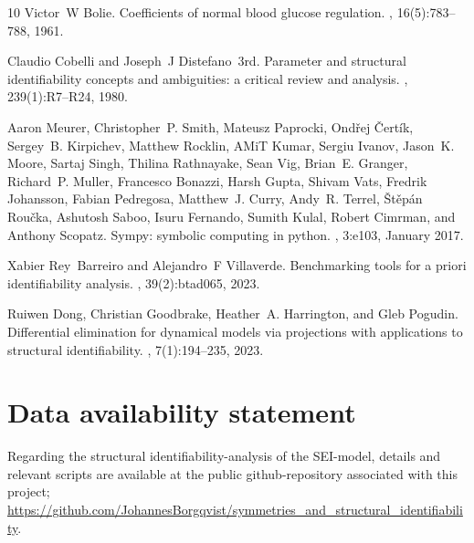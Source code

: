 \documentclass[12pt]{article}
\begin{document}
\begin{thebibliography}{10}
Victor~W Bolie.
\newblock Coefficients of normal blood glucose regulation.
, 16(5):783--788, 1961.

Claudio Cobelli and Joseph~J Distefano~3rd.
\newblock Parameter and structural identifiability concepts and ambiguities: a
  critical review and analysis.
, 239(1):R7--R24, 1980.

Aaron Meurer, Christopher~P. Smith, Mateusz Paprocki, Ond\v{r}ej
  \v{C}ert\'{i}k, Sergey~B. Kirpichev, Matthew Rocklin, AMiT Kumar, Sergiu
  Ivanov, Jason~K. Moore, Sartaj Singh, Thilina Rathnayake, Sean Vig, Brian~E.
  Granger, Richard~P. Muller, Francesco Bonazzi, Harsh Gupta, Shivam Vats,
  Fredrik Johansson, Fabian Pedregosa, Matthew~J. Curry, Andy~R. Terrel,
  \v{S}t\v{e}p\'{a}n Rou\v{c}ka, Ashutosh Saboo, Isuru Fernando, Sumith Kulal,
  Robert Cimrman, and Anthony Scopatz.
\newblock Sympy: symbolic computing in python.
, 3:e103, January 2017.

Xabier Rey~Barreiro and Alejandro~F Villaverde.
\newblock Benchmarking tools for a priori identifiability analysis.
, 39(2):btad065, 2023.

Ruiwen Dong, Christian Goodbrake, Heather~A. Harrington, and Gleb Pogudin.
\newblock Differential elimination for dynamical models via projections with
  applications to structural identifiability.
, 7(1):194--235,
  2023.

\end{thebibliography}




\section*{Data availability statement}
Regarding the structural identifiability-analysis of the SEI-model, details and relevant scripts are available at the public github-repository associated with this project; \url{https://github.com/JohannesBorgqvist/symmetries_and_structural_identifiability}.
\end{document}
